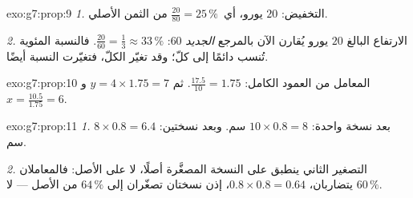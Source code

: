 \begin{solution}{exo:g7:prop:9}
\emph{1.} التخفيض: $20$ يورو، أي\ $\frac{20}{80} = 25\,\%$ من الثمن
الأصلي.

\emph{2.} الارتفاع البالغ $20$ يورو يُقارن الآن بالمرجع
\emph{الجديد} $60$: $\frac{20}{60} = \frac13 \approx 33\,\%$. فالنسبة المئوية
تُنسب دائمًا إلى كلّ؛ وقد تغيّر الكلّ، فتغيّرت النسبة
أيضًا.
\end{solution}

\begin{solution}{exo:g7:prop:10}
المعامل من العمود الكامل: $\frac{17.5}{10} = 1.75$. ثم
$y = 4 \times 1.75 = 7$ و $x = \frac{10.5}{1.75} = 6$.
\end{solution}

\begin{solution}{exo:g7:prop:11}
\emph{1.} بعد نسخة واحدة: $10 \times 0.8 = 8$ سم. وبعد نسختين:
$8 \times 0.8 = 6.4$ سم.

\emph{2.} التصغير الثاني ينطبق على النسخة المصغَّرة أصلًا،
لا على الأصل: فالمعاملان يتضاربان،
$0.8 \times 0.8 = 0.64$، إذن نسختان تصغّران إلى $64\,\%$ من
الأصل --- لا $60\,\%$.
\end{solution}

